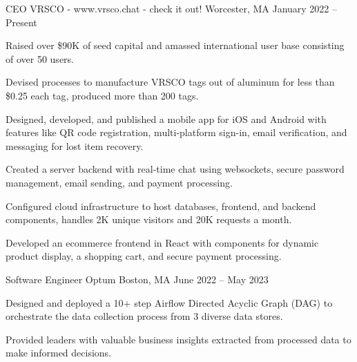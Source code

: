 

\begin{cventries}

  \cventry
    {CEO} %
    {VRSCO - www.vrsco.chat - check it out!} %
    {Worcester, MA} %
    {January 2022 – Present}
    {
      \begin{cvitems} %
      \item {Raised over \$90K of seed capital and amassed international user base consisting of over 50 users.}
      \item {Devised processes to manufacture VRSCO tags out of aluminum for less than \$0.25 each tag, produced more than 200 tags.}
      \item {Designed, developed, and published a mobile app for iOS and Android with features like QR code registration, multi-platform sign-in, email verification, and messaging for lost item recovery.}
      \item {Created a server backend with real-time chat using websockets, secure password management, email sending, and payment processing.}
      \item {Configured cloud infrastructure to host databases, frontend, and backend components, handles 2K unique visitors and 20K requests a month.}
      \item {Developed an ecommerce frontend in React with components for dynamic product display, a shopping cart, and secure payment processing.}
      \end{cvitems}
    }
  \cventry
    {Software Engineer} %
    {Optum} %
    {Boston, MA} %
    {June 2022 – May 2023} %
    {
      \begin{cvitems} %
        \item {Designed and deployed a 10+ step Airflow Directed Acyclic Graph (DAG) to orchestrate the data collection process from 3 diverse data stores.}
        \item {Provided leaders with valuable business insights extracted from processed data to make informed decisions.}

\end{cvitems}}
\end{cventries}
